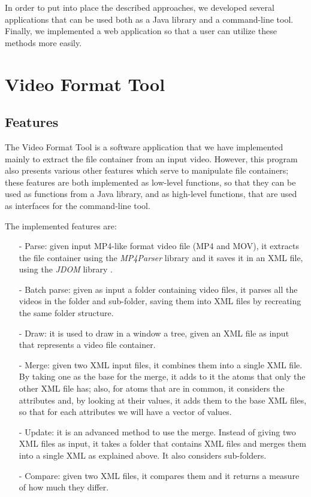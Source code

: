 In order to put into place the described approaches, we developed several applications that can be used both as a Java library and a command-line tool. Finally, we implemented a web application so that a user can utilize these methods more easily.

\section{Video Format Tool}

\subsection{Features}

The Video Format Tool is a software application that we have implemented mainly to extract the file container from an input video. However, this program also presents various other features which serve to manipulate file containers; these features are both implemented as low-level functions, so that they can be used as functions from a Java library, and as high-level functions, that are used as interfaces for the command-line tool.

The implemented features are:
\begin{itemize}
\item[-] Parse: given input MP4-like format video file (MP4 and MOV), it extracts the file container using the \emph{MP4Parser} library \cite{mp4parser} and it saves it in an XML file, using the \emph{JDOM} library \cite{jdom}.
\item[-] Batch parse: given as input a folder containing video files, it parses all the videos in the folder and sub-folder, saving them into XML files by recreating the same folder structure.
\item[-] Draw: it is used to draw in a window a tree, given an XML file as input that represents a video file container.
\item[-] Merge: given two XML input files, it combines them into a single XML file. By taking one as the base for the merge, it adds to it the atoms that only the other XML file has; also, for atoms that are in common, it considers the attributes and, by looking at their values, it adds them to the base XML files, so that for each attributes we will have a vector of values.
\item[-] Update: it is an advanced method to use the merge. Instead of giving two XML files as input, it takes a folder that contains XML files and merges them into a single XML as explained above. It also considers sub-folders.
\item[-] Compare: given two XML files, it compares them and it returns a measure of how much they differ.
\end{itemize}

